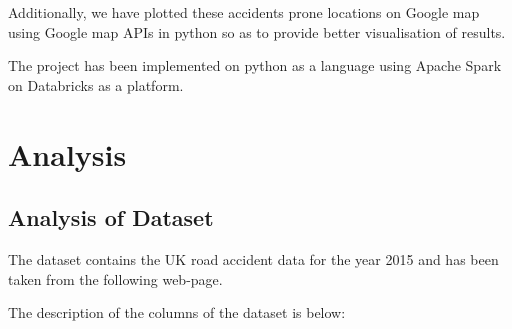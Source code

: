 \documentclass{acm_proc_article-sp}
\begin{document}
Additionally, we have plotted these accidents prone locations on Google map using Google map APIs in python so as to provide better visualisation of results.

The project has been implemented on python as a language using Apache Spark on Databricks as a platform.

\section{Analysis}


\subsection{Analysis of Dataset}

The dataset contains the UK road accident data for the year 2015 and has been taken from the following web-page. \cite{data-gov-uk}

The description of the columns of the dataset is below:
\end{document}
